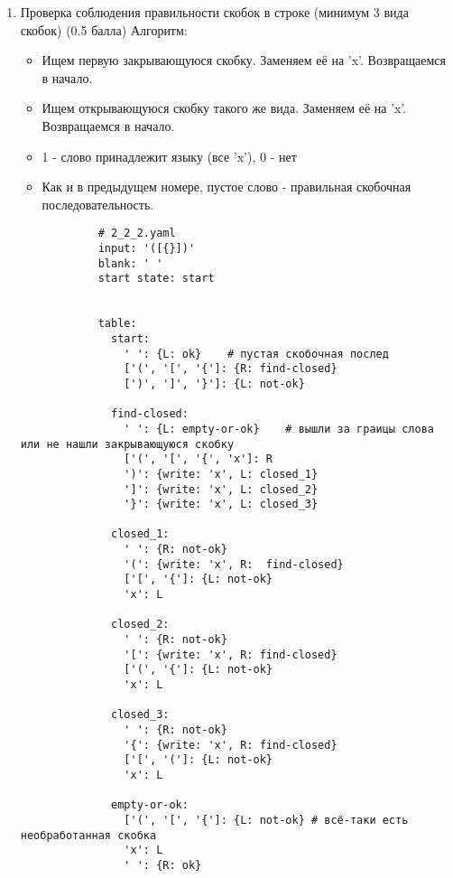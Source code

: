 \documentclass{article}
\begin{document}
\begin{enumerate}
    
    \item Проверка соблюдения правильности скобок в строке (минимум 3 вида скобок) (0.5 балла)
        Алгоритм:
        \begin{itemize}
            \item Ищем первую закрывающуюся скобку. Заменяем её на 'x'. Возвращаемся в начало.
            \item Ищем открывающуюся скобку такого же вида. Заменяем её на 'x'. Возвращаемся в начало.
            \item 1 - слово принадлежит языку (все 'x'), 0 - нет
            \item Как и в предыдущем номере, пустое слово - правильная скобочная последовательность.
        \end{itemize}
        
        \begin{verbatim}
            # 2_2_2.yaml
            input: '([{}])'
            blank: ' '
            start state: start
            
            
            table:
              start:
                ' ': {L: ok}    # пустая скобочная послед
                ['(', '[', '{']: {R: find-closed}
                [')', ']', '}']: {L: not-ok}
                
              find-closed:
                ' ': {L: empty-or-ok}    # вышли за граицы слова или не нашли закрывающуюся скобку
                ['(', '[', '{', 'x']: R
                ')': {write: 'x', L: closed_1}
                ']': {write: 'x', L: closed_2}
                '}': {write: 'x', L: closed_3}
              
              closed_1:
                ' ': {R: not-ok}
                '(': {write: 'x', R:  find-closed}
                ['[', '{']: {L: not-ok}
                'x': L
              
              closed_2:
                ' ': {R: not-ok}
                '[': {write: 'x', R: find-closed}
                ['(', '{']: {L: not-ok}
                'x': L
            
              closed_3:
                ' ': {R: not-ok}
                '{': {write: 'x', R: find-closed}
                ['[', '(']: {L: not-ok}
                'x': L 
                
              empty-or-ok:
                ['(', '[', '{']: {L: not-ok} # всё-таки есть необработанная скобка
                'x': L
                ' ': {R: ok}
                

\end{verbatim}
\end{enumerate}
\end{document}

